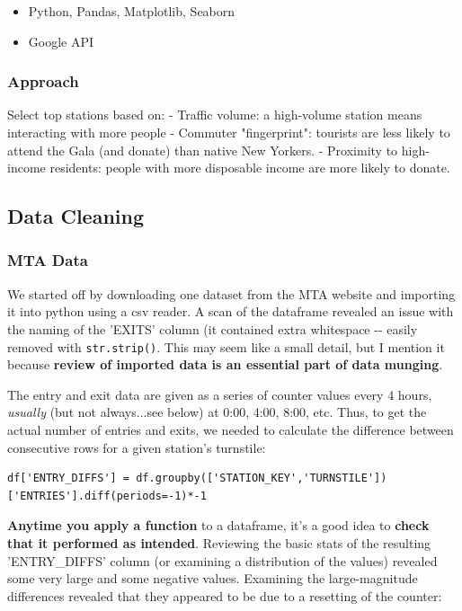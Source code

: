 \documentclass[11pt]{article}
\providecommand{\tightlist}{%
      \setlength{\itemsep}{0pt}\setlength{\parskip}{0pt}}
\begin{document}
\begin{itemize}
\tightlist
\item
  Python, Pandas, Matplotlib, Seaborn
\item
  Google API
\end{itemize}

\subsubsection{Approach}\label{approach}

Select top stations based on: - Traffic volume: a high-volume station
means interacting with more people - Commuter "fingerprint": tourists
are less likely to attend the Gala (and donate) than native New Yorkers.
- Proximity to high-income residents: people with more disposable income
are more likely to donate.

    \subsection{Data Cleaning}\label{data-cleaning}

\subsubsection{MTA Data}\label{mta-data}

We started off by downloading one dataset from the MTA website and
importing it into python using a csv reader. A scan of the dataframe
revealed an issue with the naming of the 'EXITS' column (it contained
extra whitespace -\/- easily removed with \texttt{str.strip()}. This may
seem like a small detail, but I mention it because \textbf{review of
imported data is an essential part of data munging}.

The entry and exit data are given as a series of counter values every 4
hours, \emph{usually} (but not always...see below) at 0:00, 4:00, 8:00,
etc. Thus, to get the actual number of entries and exits, we needed to
calculate the difference between consecutive rows for a given station's
turnstile:

    \begin{verbatim}
df['ENTRY_DIFFS'] = df.groupby(['STATION_KEY','TURNSTILE'])['ENTRIES'].diff(periods=-1)*-1
\end{verbatim}

    \textbf{Anytime you apply a function} to a dataframe, it's a good idea
to \textbf{check that it performed as intended}. Reviewing the basic
stats of the resulting 'ENTRY\_DIFFS' column (or examining a
distribution of the values) revealed some very large and some negative
values. Examining the large-magnitude differences revealed that they
appeared to be due to a resetting of the counter:
\end{document}
